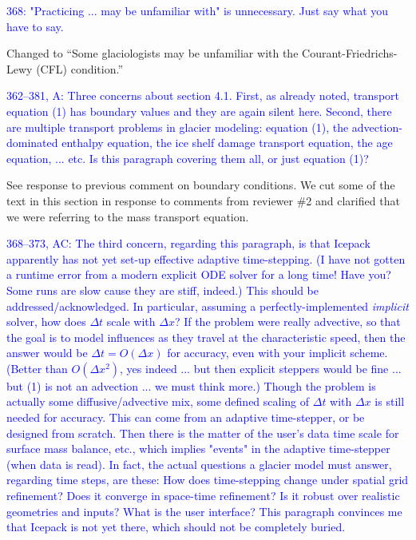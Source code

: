 \documentclass{article}
\theoremstyle{definition}
\theoremstyle{plain}
\begin{document}
\textcolor{blue}{368:  "Practicing ... may be unfamiliar with" is unnecessary.  Just say what you have to say.}

Changed to ``Some glaciologists may be unfamiliar with the Courant-Friedrichs-Lewy (CFL) condition.''

\textcolor{blue}{362--381, A:  Three concerns about section 4.1.  First, as already noted, transport equation (1) has boundary values and they are again silent here.  Second, there are multiple transport problems in glacier modeling: equation (1), the advection-dominated enthalpy equation, the ice shelf damage transport equation, the age equation, ... etc.  Is this paragraph covering them all, or just equation (1)?}

See response to previous comment on boundary conditions.
We cut some of the text in this section in response to comments from reviewer \#2 and clarified that we were referring to the mass transport equation.

\textcolor{blue}{368--373, AC:  The third concern, regarding this paragraph, is that Icepack apparently has not yet set-up effective adaptive time-stepping.  (I have not gotten a runtime error from a modern explicit ODE solver for a long time!  Have you?  Some runs are slow cause they are stiff, indeed.)  This should be addressed/acknowledged.  In particular, assuming a perfectly-implemented \emph{implicit} solver, how does $\Delta t$ scale with $\Delta x$?  If the problem were really advective, so that the goal is to model influences as they travel at the characteristic speed, then the answer would be $\Delta t = O(\Delta x)$ for accuracy, even with your implicit scheme.  (Better than $O(\Delta x^2)$, yes indeed ... but then explicit steppers would be fine ... but (1) is not an advection ... we must think more.)  Though the problem is actually some diffusive/advective mix, some defined scaling of $\Delta t$ with $\Delta x$ is still needed for accuracy.  This can come from an adaptive time-stepper, or be designed from scratch.  Then there is the matter of the user's data time scale for surface mass balance, etc., which implies "events" in the adaptive time-stepper (when data is read).  In fact, the actual questions a glacier model must answer, regarding time steps, are these:  How does time-stepping change under spatial grid refinement?  Does it converge in space-time refinement?  Is it robust over realistic geometries and inputs?  What is the user interface?  This paragraph convinces me that Icepack is not yet there, which should not be completely buried.}
\end{document}

